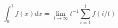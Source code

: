 \documentclass{article}
\begin{document}
$$ \int_0^1 f(x)dx = \lim_{t \to \infty} t^{-1} \sum^t_{i=1} f(i/t)$$
\end{document}

